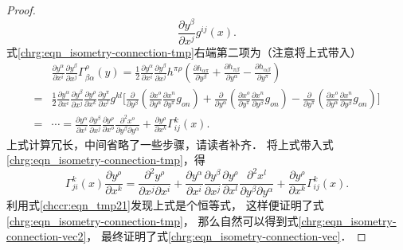 \begin{proof}
\begin{equation}
        \frac{\partial y^\beta}{\partial x^j} g^{ij}(x) .
    \end{equation}
    式\eqref{chrg:eqn_isometry-connection-tmp}右端第二项为（注意将上式带入）
    \setlength{\mathindent}{0em}
    \begin{align*}
      &\frac{\partial y^\alpha}{\partial x^i}
      \frac{\partial y^\beta}{\partial x^j}
      \Gamma^{\rho}_{\beta\alpha}(y)
      = \frac{1}{2}\frac{{\partial {y^\alpha }}}{{\partial {x^i}}}\frac{{\partial {y^\beta }}}{{\partial {x^j}}}
      {{h}^{\pi \rho }}\left( \frac{\partial h_{\alpha \pi   }} {\partial y^\beta}
           +\frac{\partial h_{\pi \beta   }} {\partial y^\alpha }
           -\frac{\partial h_{\alpha \beta}} {\partial y^\pi } \right)\\
      =& \frac{1}{2}\frac{{\partial {y^\alpha }}}{{\partial {x^i}}}\frac{{\partial {y^\beta }}}{{\partial {x^j}}}
      \frac{{\partial {y^\rho }}}{{\partial {x^k}}}\frac{{\partial {y^\pi }}}{{\partial {x^l}}}
      {g^{kl}} \biggl[ \frac{\partial }{{\partial {y^\beta }}}
      \left( {\frac{{\partial {x^o}}}{{\partial {y^\alpha }}}\frac{{\partial {x^n}}}{{\partial {y^\pi }}}{g_{on}}} \right)
       +\frac{\partial }{{\partial {y^\alpha }}}\left( {\frac{{\partial {x^o}}}{{\partial {y^\pi }}}
           \frac{{\partial {x^n}}}{{\partial {y^\beta }}}{g_{on}}} \right)
       - \frac{\partial }{{\partial {y^\pi }}}\left( {\frac{{\partial {x^o}}}{{\partial {y^\alpha }}}
           \frac{{\partial {x^n}}}{{\partial {y^\beta }}}{g_{on}}} \right)  \biggr] \\
      =& \cdots =
      \frac{{\partial {y^\alpha }}}{{\partial {x^i}}}\frac{{\partial {y^\beta }}}{{\partial {x^j}}}
      \frac{{\partial {y^\rho }}}{{\partial {x^o}}}\frac{{{\partial ^2}{x^o}}}{{\partial {y^\beta }\partial {y^\alpha }}}
       + \frac{{\partial {y^\rho }}}{{\partial {x^k}}}\Gamma _{ij}^k\left( x \right) .
    \end{align*}\setlength{\mathindent}{2em}
    上式计算冗长，中间省略了一些步骤，请读者补齐．
    将上式带入式\eqref{chrg:eqn_isometry-connection-tmp}，得
    \begin{equation}
        \Gamma^{k}_{ji}(x) \frac{\partial y^\rho}{\partial x^k} =
        \frac{\partial^2 y^\rho}{\partial x^j \partial x^i}+
        \frac{{\partial {y^\alpha }}}{{\partial {x^i}}}\frac{{\partial {y^\beta }}}{{\partial {x^j}}}
        \frac{{\partial {y^\rho }}}{{\partial {x^l}}}\frac{{{\partial ^2}{x^l}}}{{\partial {y^\beta }\partial {y^\alpha }}}
         + \frac{{\partial {y^\rho }}}{{\partial {x^k}}}\Gamma _{ij}^k\left( x \right) .
    \end{equation}
    利用式\eqref{chccr:eqn_tmp21}发现上式是个恒等式，
    这样便证明了式\eqref{chrg:eqn_isometry-connection-tmp}，
    那么自然可以得到式\eqref{chrg:eqn_isometry-connection-vec2}，
    最终证明了式\eqref{chrg:eqn_isometry-connection-vec}．
\end{proof}

